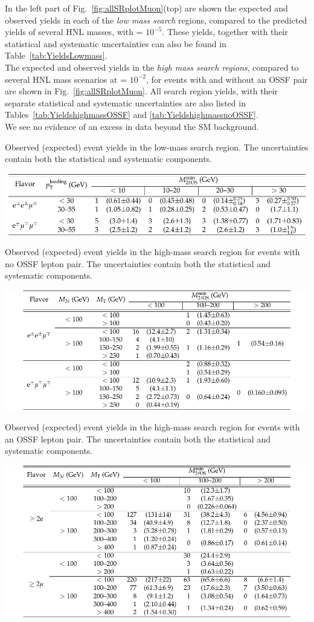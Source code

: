 In the left part of Fig.~\ref{fig:allSRplotMuon}(top) are shown 
the expected and observed yields in each of the \emph{low mass search}
regions, compared to the predicted yields of several HNL masses, with \mixpar = $10^{-5}$. These yields, together with their
statistical and systematic uncertainties can also be found in
Table~\ref{tab:YieldsLowmass}.  \\
The expected and observed yields in the \emph{high mass search regions},
compared to several HNL mass scenarios at \mixpar = $10^{-2}$, for
events with and without an OSSF pair are shown in
Fig.~\ref{fig:allSRplotMuon}. All search region yields, with their
separate statistical and systematic uncertainties are also listed in
Tables~\ref{tab:YieldshighmassOSSF} and
\ref{tab:YieldshighmassnoOSSF}. \\
We see no evidence of an excess in data beyond the SM background.
\small{
\begin{table}[h]
\centering
\caption{Observed (expected) event yields in the low-mass search region. The uncertainties
contain both the statistical and systematic components. \willem}
\label{tab:YieldsLowmass}
\includegraphics[width=0.65\linewidth]{Figures/c5/tables/CMS-EXO-17-012_Table_0A1.pdf}
\end{table}
\begin{table}[h]
\centering
\caption{Observed (expected) event yields in the high-mass search region for events with no
OSSF lepton pair. The uncertainties contain both the statistical and systematic components. \willem}
\label{tab:YieldshighmassOSSF}
\includegraphics[width=0.7\linewidth]{Figures/c5/tables/CMS-EXO-17-012_Table_0A2.pdf}
\end{table}
\begin{table}[h]
\centering
\caption{Observed (expected) event yields in the high-mass search region for events with an
OSSF lepton pair. The uncertainties contain both the statistical and systematic components. \willem}
\label{tab:YieldshighmassnoOSSF}
\includegraphics[width=0.7\linewidth]{Figures/c5/tables/CMS-EXO-17-012_Table_0A3.pdf}
\end{table}
}
